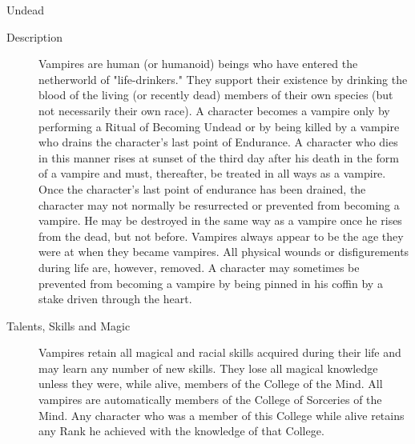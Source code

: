 \begin{mmgroup}{Undead}
\begin{description}
\item[Description]  Vampires are human (or humanoid) beings who
have entered the netherworld of "life-drinkers." They support
their existence by drinking the blood of the living (or recently
dead) members of their own species (but not necessarily their
own race). A character becomes a vampire only by performing a
Ritual of Becoming Undead or by being killed by a vampire who
drains the character's last point of Endurance. A character who
dies in this manner rises at sunset of the third day after his
death in the form of a vampire and must, thereafter, be treated
in all ways as a vampire. Once the character's last point of
endurance has been drained, the character may not normally be
resurrected or prevented from becoming a vampire. He may be
destroyed in the same way as a vampire once he rises from the
dead, but not before. Vampires always appear to be the age they
were at when they became vampires. All physical wounds or
disfigurements during life are, however, removed. A character
may sometimes be prevented from becoming a vampire by being
pinned in his coffin by a stake driven through the heart.


\item[Talents, Skills and Magic] Vampires retain all magical and racial skills acquired
during their life and may learn any number of new skills. They lose
all magical knowledge unless they were, while alive, members of the
College of the Mind. All vampires are automatically members of the
College of Sorceries of the Mind. Any character who was a member of
this College while alive retains any Rank he achieved with the
knowledge of that College.


\end{description}
\end{mmgroup}
